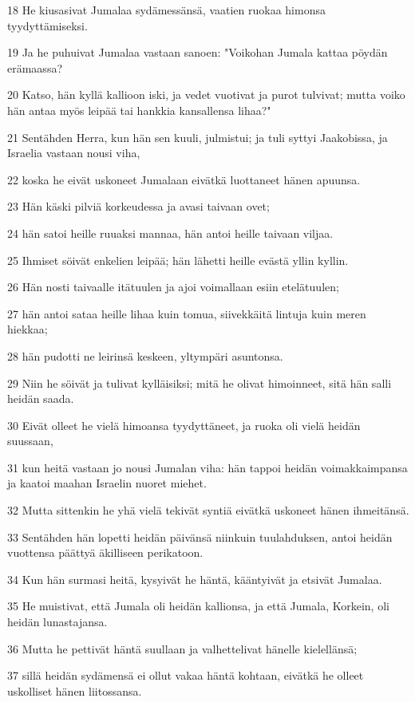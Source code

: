\par 18 He kiusasivat Jumalaa sydämessänsä, vaatien ruokaa himonsa tyydyttämiseksi.
\par 19 Ja he puhuivat Jumalaa vastaan sanoen: "Voikohan Jumala kattaa pöydän erämaassa?
\par 20 Katso, hän kyllä kallioon iski, ja vedet vuotivat ja purot tulvivat; mutta voiko hän antaa myös leipää tai hankkia kansallensa lihaa?"
\par 21 Sentähden Herra, kun hän sen kuuli, julmistui; ja tuli syttyi Jaakobissa, ja Israelia vastaan nousi viha,
\par 22 koska he eivät uskoneet Jumalaan eivätkä luottaneet hänen apuunsa.
\par 23 Hän käski pilviä korkeudessa ja avasi taivaan ovet;
\par 24 hän satoi heille ruuaksi mannaa, hän antoi heille taivaan viljaa.
\par 25 Ihmiset söivät enkelien leipää; hän lähetti heille evästä yllin kyllin.
\par 26 Hän nosti taivaalle itätuulen ja ajoi voimallaan esiin etelätuulen;
\par 27 hän antoi sataa heille lihaa kuin tomua, siivekkäitä lintuja kuin meren hiekkaa;
\par 28 hän pudotti ne leirinsä keskeen, yltympäri asuntonsa.
\par 29 Niin he söivät ja tulivat kylläisiksi; mitä he olivat himoinneet, sitä hän salli heidän saada.
\par 30 Eivät olleet he vielä himoansa tyydyttäneet, ja ruoka oli vielä heidän suussaan,
\par 31 kun heitä vastaan jo nousi Jumalan viha: hän tappoi heidän voimakkaimpansa ja kaatoi maahan Israelin nuoret miehet.
\par 32 Mutta sittenkin he yhä vielä tekivät syntiä eivätkä uskoneet hänen ihmeitänsä.
\par 33 Sentähden hän lopetti heidän päivänsä niinkuin tuulahduksen, antoi heidän vuottensa päättyä äkilliseen perikatoon.
\par 34 Kun hän surmasi heitä, kysyivät he häntä, kääntyivät ja etsivät Jumalaa.
\par 35 He muistivat, että Jumala oli heidän kallionsa, ja että Jumala, Korkein, oli heidän lunastajansa.
\par 36 Mutta he pettivät häntä suullaan ja valhettelivat hänelle kielellänsä;
\par 37 sillä heidän sydämensä ei ollut vakaa häntä kohtaan, eivätkä he olleet uskolliset hänen liitossansa.

